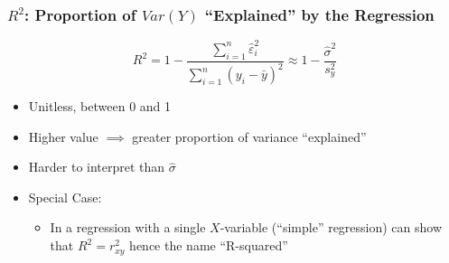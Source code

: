 \begin{frame}
  \frametitle{$R^2$: Proportion of $Var(Y)$ ``Explained'' by the Regression}
\[
  R^2 = 1 - \frac{\sum_{i=1}^n \widehat{\varepsilon}_i^2}{\sum_{i=1}^n (y_i - \bar{y})^2} \approx 1 - \frac{\widehat{\sigma}^2}{s_y^2}
\]

		\begin{itemize}
      \item Unitless, between 0 and 1
      \item Higher value $\implies$ greater proportion of variance ``explained''
      \item Harder to interpret than $\widehat{\sigma}$
      \item Special Case:
        \begin{itemize}
          \item In a regression with a single $X$-variable (``simple'' regression) can show that $R^2 = r_{xy}^2$ hence the name ``R-squared''
        \end{itemize}
    \end{itemize}
\end{frame}


